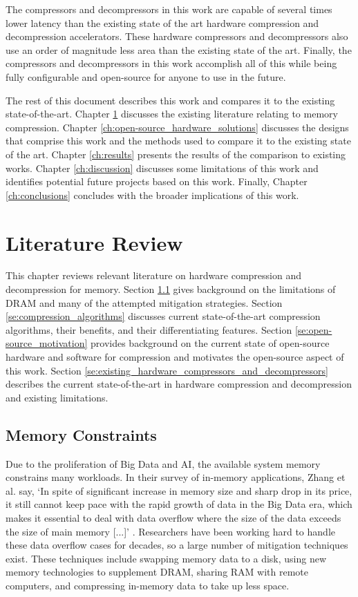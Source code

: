 \documentclass[doublespace,nopageskip]{VTthesis}
\begin{document}
The compressors and decompressors in this work are capable of several times lower latency than the existing state of the art hardware compression and decompression accelerators. These hardware compressors and decompressors also use an order of magnitude less area than the existing state of the art. Finally, the compressors and decompressors in this work accomplish all of this while being fully configurable and open-source for anyone to use in the future. 

The rest of this document describes this work and compares it to the existing state-of-the-art. Chapter \ref{ch:literature_review} discusses the existing literature relating to memory compression. Chapter \ref{ch:open-source_hardware_solutions} discusses the designs that comprise this work and the methods used to compare it to the existing state of the art. Chapter \ref{ch:results} presents the results of the comparison to existing works. Chapter \ref{ch:discussion} discusses some limitations of this work and identifies potential future projects based on this work. Finally, Chapter \ref{ch:conclusions} concludes with the broader implications of this work.

\chapter{Literature Review} \label{ch:literature_review}
This chapter reviews relevant literature on hardware compression and decompression for memory. Section \ref{se:memory_constraints} gives background on the limitations of DRAM and many of the attempted mitigation strategies. Section \ref{se:compression_algorithms} discusses current state-of-the-art compression algorithms, their benefits, and their differentiating features. Section \ref{se:open-source_motivation} provides background on the current state of open-source hardware and software for compression and motivates the open-source aspect of this work. Section \ref{se:existing_hardware_compressors_and_decompressors} describes the current state-of-the-art in hardware compression and decompression and existing limitations.

\section{Memory Constraints}\label{se:memory_constraints}
Due to the proliferation of Big Data and AI, the available system memory constrains many workloads. In their survey of in-memory applications, Zhang et al. say, `In spite of significant increase in memory size and sharp drop in its price, it still cannot keep pace with the rapid growth of data in the Big Data era, which makes it essential to deal with data overflow where the size of the data exceeds the size of main memory [...]' \cite{inmemorybigdata}. Researchers have been working hard to handle these data overflow cases for decades, so a large number of mitigation techniques exist. These techniques include swapping memory data to a disk, using new memory technologies to supplement DRAM, sharing RAM with remote computers, and compressing in-memory data to take up less space.
\end{document}
